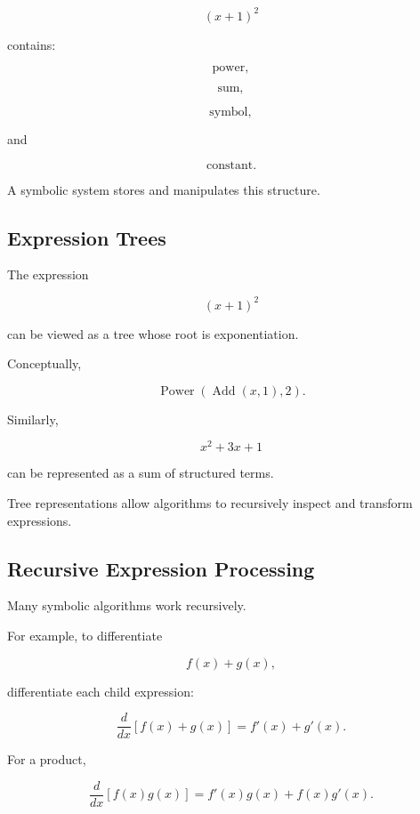 \[
\boxed{
(x+1)^2
}
\]

contains:

\[
\boxed{
\text{power},
}
\]

\[
\boxed{
\text{sum},
}
\]

\[
\boxed{
\text{symbol},
}
\]

and

\[
\boxed{
\text{constant}.
}
\]

A symbolic system stores and manipulates this structure.

\subsection{Expression Trees}
\label{subsec:expression-trees}

The expression

\[
(x+1)^2
\]

can be viewed as a tree whose root is exponentiation.

Conceptually,

\[
\boxed{
\operatorname{Power}
\left(
\operatorname{Add}(x,1),
2
\right).
}
\]

Similarly,

\[
x^2+3x+1
\]

can be represented as a sum of structured terms.

Tree representations allow algorithms to recursively inspect and transform
expressions.

\subsection{Recursive Expression Processing}
\label{subsec:recursive-expression-processing}

Many symbolic algorithms work recursively.

For example, to differentiate

\[
f(x)+g(x),
\]

differentiate each child expression:

\[
\boxed{
\frac{d}{dx}
[
f(x)+g(x)
]
=
f'(x)+g'(x).
}
\]

For a product,

\[
\boxed{
\frac{d}{dx}
[
f(x)g(x)
]
=
f'(x)g(x)+f(x)g'(x).
}
\]


